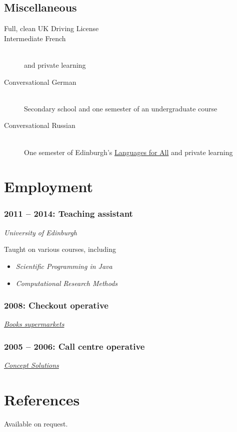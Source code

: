\documentclass[10pt]{article}
\begin{document}
        \subsection{Miscellaneous}
            \begin{description}
                \item[Full, clean UK Driving License]
                \item[Intermediate French] \hfill \\
                      and private learning
                \item[Conversational German] \hfill \\
                    Secondary school and one semester of an undergraduate course
                \item[Conversational Russian] \hfill \\
                    One semester of Edinburgh's \href{http://www.ed.ac.uk/studying/short-courses/languages/for-all}{Languages for All} and private learning
            \end{description}

    \section{Employment}

        \subsubsection{2011 -- 2014: Teaching assistant}

            \textit{University of Edinburgh}

            Taught on various courses, including
            \begin{itemize}
                \item\textit{Scientific Programming in Java}
                \item\textit{Computational Research Methods}
            \end{itemize}

        \subsubsection{2008: Checkout operative}

            \textit{\href{http://www.booths.co.uk}{Books supermarkets}}

        \subsubsection{2005 -- 2006: Call centre operative}

            \textit{\href{http://www.conceptpropertyclaims.co.uk}{Concept Solutions}}

    \section{References}

        Available on request.
\end{document}
